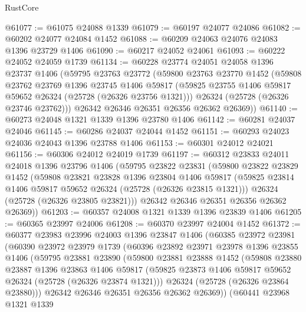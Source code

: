 \begin{lexlean}{RustCore}
\begin{coremodule}
@61077 := @61075 @24088 @1339
@61079 := @60197 @24077 @24086
@61082 := @60202 @24077 @24084 @1452
@61088 := @60209 @24063 @24076 @24083 @1396 @23729 @1406
@61090 := @60217 @24052 @24061
@61093 := @60222 @24052 @24059 @1739
@61134 := @60228
    @23774
    @24051
    @24058
    @1396
    @23737
    @1406
    (@59795
      @23763
      @23772
      (@59800
        @23763
        @23770
        @1452
        (@59808
          @23762
          @23769
          @1396
          @23745
          @1406
          @59817
          (@59825 @23755 @1406 @59817 @59652 @26324 (@25728 (@26326 @23756 @1321)))
          @26324
          (@25728 (@26326 @23746 @23762)))
        @26342
        @26346
        @26351
        @26356
        @26362
        @26369))
@61140 := @60273 @24048 @1321 @1339 @1396 @23780 @1406
@61142 := @60281 @24037 @24046
@61145 := @60286 @24037 @24044 @1452
@61151 := @60293 @24023 @24036 @24043 @1396 @23788 @1406
@61153 := @60301 @24012 @24021
@61156 := @60306 @24012 @24019 @1739
@61197 := @60312
    @23833
    @24011
    @24018
    @1396
    @23796
    @1406
    (@59795
      @23822
      @23831
      (@59800
        @23822
        @23829
        @1452
        (@59808
          @23821
          @23828
          @1396
          @23804
          @1406
          @59817
          (@59825 @23814 @1406 @59817 @59652 @26324 (@25728 (@26326 @23815 @1321)))
          @26324
          (@25728 (@26326 @23805 @23821)))
        @26342
        @26346
        @26351
        @26356
        @26362
        @26369))
@61203 := @60357 @24008 @1321 @1339 @1396 @23839 @1406
@61205 := @60365 @23997 @24006
@61208 := @60370 @23997 @24004 @1452
@61372 := @60377
    @23983
    @23996
    @24003
    @1396
    @23847
    @1406
    (@60385
      @23972
      @23981
      (@60390
        @23972
        @23979
        @1739
        (@60396
          @23892
          @23971
          @23978
          @1396
          @23855
          @1406
          (@59795
            @23881
            @23890
            (@59800
              @23881
              @23888
              @1452
              (@59808
                @23880
                @23887
                @1396
                @23863
                @1406
                @59817
                (@59825 @23873 @1406 @59817 @59652 @26324 (@25728 (@26326 @23874 @1321)))
                @26324
                (@25728 (@26326 @23864 @23880)))
              @26342
              @26346
              @26351
              @26356
              @26362
              @26369))
          (@60441
            @23968
            @1321
            @1339

\end{coremodule}
\end{lexlean}
